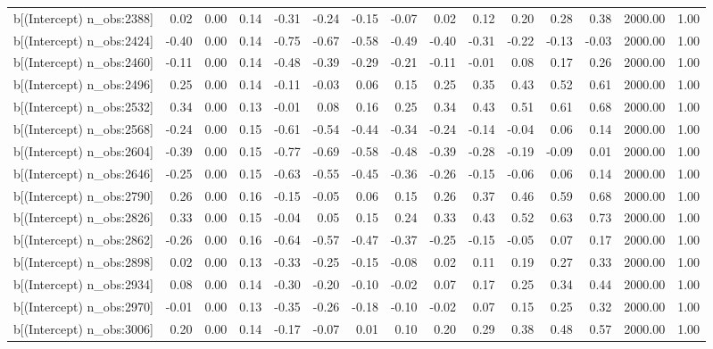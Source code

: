 \begin{table}[ht]
\begin{tabular}{rrrrrrrrrrrrrrr}
  b[(Intercept) n\_obs:2388] & 0.02 & 0.00 & 0.14 & -0.31 & -0.24 & -0.15 & -0.07 & 0.02 & 0.12 & 0.20 & 0.28 & 0.38 & 2000.00 & 1.00 \\ 
  b[(Intercept) n\_obs:2424] & -0.40 & 0.00 & 0.14 & -0.75 & -0.67 & -0.58 & -0.49 & -0.40 & -0.31 & -0.22 & -0.13 & -0.03 & 2000.00 & 1.00 \\ 
  b[(Intercept) n\_obs:2460] & -0.11 & 0.00 & 0.14 & -0.48 & -0.39 & -0.29 & -0.21 & -0.11 & -0.01 & 0.08 & 0.17 & 0.26 & 2000.00 & 1.00 \\ 
  b[(Intercept) n\_obs:2496] & 0.25 & 0.00 & 0.14 & -0.11 & -0.03 & 0.06 & 0.15 & 0.25 & 0.35 & 0.43 & 0.52 & 0.61 & 2000.00 & 1.00 \\ 
  b[(Intercept) n\_obs:2532] & 0.34 & 0.00 & 0.13 & -0.01 & 0.08 & 0.16 & 0.25 & 0.34 & 0.43 & 0.51 & 0.61 & 0.68 & 2000.00 & 1.00 \\ 
  b[(Intercept) n\_obs:2568] & -0.24 & 0.00 & 0.15 & -0.61 & -0.54 & -0.44 & -0.34 & -0.24 & -0.14 & -0.04 & 0.06 & 0.14 & 2000.00 & 1.00 \\ 
  b[(Intercept) n\_obs:2604] & -0.39 & 0.00 & 0.15 & -0.77 & -0.69 & -0.58 & -0.48 & -0.39 & -0.28 & -0.19 & -0.09 & 0.01 & 2000.00 & 1.00 \\ 
  b[(Intercept) n\_obs:2646] & -0.25 & 0.00 & 0.15 & -0.63 & -0.55 & -0.45 & -0.36 & -0.26 & -0.15 & -0.06 & 0.06 & 0.14 & 2000.00 & 1.00 \\ 
  b[(Intercept) n\_obs:2790] & 0.26 & 0.00 & 0.16 & -0.15 & -0.05 & 0.06 & 0.15 & 0.26 & 0.37 & 0.46 & 0.59 & 0.68 & 2000.00 & 1.00 \\ 
  b[(Intercept) n\_obs:2826] & 0.33 & 0.00 & 0.15 & -0.04 & 0.05 & 0.15 & 0.24 & 0.33 & 0.43 & 0.52 & 0.63 & 0.73 & 2000.00 & 1.00 \\ 
  b[(Intercept) n\_obs:2862] & -0.26 & 0.00 & 0.16 & -0.64 & -0.57 & -0.47 & -0.37 & -0.25 & -0.15 & -0.05 & 0.07 & 0.17 & 2000.00 & 1.00 \\ 
  b[(Intercept) n\_obs:2898] & 0.02 & 0.00 & 0.13 & -0.33 & -0.25 & -0.15 & -0.08 & 0.02 & 0.11 & 0.19 & 0.27 & 0.33 & 2000.00 & 1.00 \\ 
  b[(Intercept) n\_obs:2934] & 0.08 & 0.00 & 0.14 & -0.30 & -0.20 & -0.10 & -0.02 & 0.07 & 0.17 & 0.25 & 0.34 & 0.44 & 2000.00 & 1.00 \\ 
  b[(Intercept) n\_obs:2970] & -0.01 & 0.00 & 0.13 & -0.35 & -0.26 & -0.18 & -0.10 & -0.02 & 0.07 & 0.15 & 0.25 & 0.32 & 2000.00 & 1.00 \\ 
  b[(Intercept) n\_obs:3006] & 0.20 & 0.00 & 0.14 & -0.17 & -0.07 & 0.01 & 0.10 & 0.20 & 0.29 & 0.38 & 0.48 & 0.57 & 2000.00 & 1.00 \\ 

\end{tabular}
\end{table}
